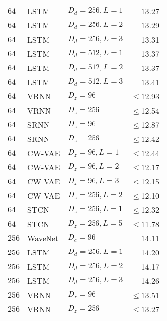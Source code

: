 {\begin{table}[p]
{\begin{tabular}{ll|lr}
        $64$      & LSTM                & $D_d=256, L=1$        & 13.27 \\
        $64$      & LSTM                & $D_d=256, L=2$        & 13.29 \\
        $64$      & LSTM                & $D_d=256, L=3$        & 13.31 \\
        $64$      & LSTM                & $D_d=512, L=1$        & 13.37 \\
        $64$      & LSTM                & $D_d=512, L=2$        & 13.37 \\
        $64$      & LSTM                & $D_d=512, L=3$        & 13.41 \\
        $64$      & VRNN                & $D_z=96$              & $\leq$12.93 \\
        $64$      & VRNN                & $D_z=256$             & $\leq$12.54 \\
        $64$      & SRNN                & $D_z=96$              & $\leq$12.87 \\
        $64$      & SRNN                & $D_z=256$             & $\leq$12.42 \\
        $64$      & CW-VAE              & $D_z=96, L=1$         & $\leq$12.44 \\
        $64$      & CW-VAE              & $D_z=96, L=2$         & $\leq$12.17 \\
        $64$      & CW-VAE              & $D_z=96, L=3$         & $\leq$12.15 \\
        $64$      & CW-VAE              & $D_z=256, L=2$        & $\leq$12.10 \\
        $64$ & STCN               & $D_z=256,L=1$               & $\leq$12.32 \\  %
        $64$ & STCN               & $D_z=256,L=5$               & $\leq$11.78 \\
        \midrule
        $256$     & WaveNet             & $D_c=96$              & 14.11 \\
        $256$     & LSTM                & $D_d=256, L=1$        & 14.20 \\
        $256$     & LSTM                & $D_d=256, L=2$        & 14.17 \\
        $256$     & LSTM                & $D_d=256, L=3$        & 14.26 \\
        $256$     & VRNN                & $D_z=96$              & $\leq$13.51 \\
        $256$     & VRNN                & $D_z=256$             & $\leq$13.27 \\

\end{tabular}}
\end{table}}
